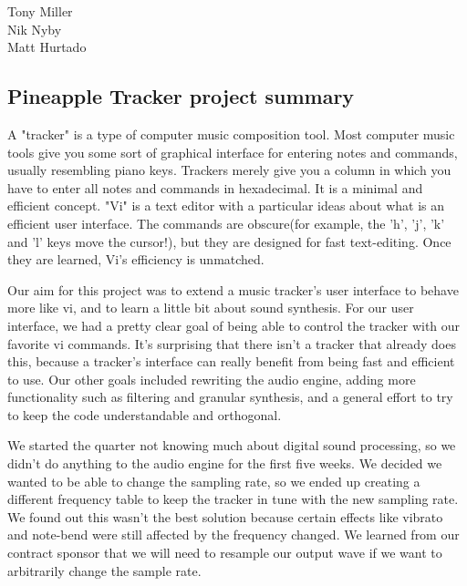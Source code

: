 \documentclass[12pt,letterpaper]{article}
\begin{document}
\begin{flushright}
Tony Miller\\
Nik Nyby\\
Matt Hurtado
\end{flushright}

\begin{center}
\section*{Pineapple Tracker project summary}
\end{center}


\doublespacing
\par
A "tracker" is a type of computer music composition tool. Most computer music tools give you some sort of graphical interface for entering notes and commands, usually resembling piano keys. Trackers merely give you a column in which you have to enter all notes and commands in hexadecimal. It is a minimal and efficient concept. "Vi" is a text editor with a particular ideas about what is an efficient user interface. The commands are obscure(for example, the 'h', 'j', 'k' and 'l' keys move the cursor!), but they are designed for fast text-editing. Once they are learned, Vi's efficiency is unmatched.
\par
Our aim for this project was to extend a music tracker's user interface to behave more like vi, and to learn a little bit about sound synthesis. For our user interface, we had a pretty clear goal of being able to control the tracker with our favorite vi commands. It's surprising that there isn't a tracker that already does this, because a tracker's interface can really benefit from being fast and efficient to use. Our other goals included rewriting the audio engine, adding more functionality such as filtering and granular synthesis, and a general effort to try to keep the code understandable and orthogonal.

\par
We started the quarter not knowing much about digital sound processing, so we didn't do anything to the audio engine for the first five weeks. We decided we wanted to be able to change the sampling rate, so we ended up creating a different frequency table to keep the tracker in tune with the new sampling rate. We found out this wasn't the best solution because certain effects like vibrato and note-bend were still affected by the frequency changed. We learned from our contract sponsor that we will need to resample our output wave if we want to arbitrarily change the sample rate.
\end{document}
